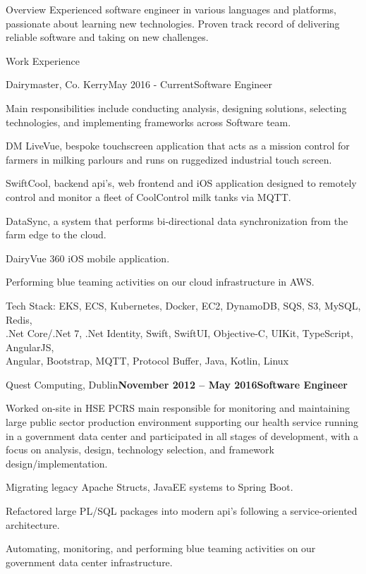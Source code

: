 \documentclass{résumé}
\begin{document}
\begin{rSection}{Overview}
\normalfont Experienced software engineer in various languages and platforms, passionate about learning new technologies. Proven track record of delivering reliable software and taking on new challenges. \\
\end{rSection}

\begin{rSection}{Work Experience}
\begin{rSubsection}{Dairymaster, Co. Kerry}{May 2016 - Current}{Software Engineer}{}
 \item \normalfont Main responsibilities include conducting analysis, designing solutions, selecting technologies, and implementing frameworks across Software team.
 \item \normalfont DM LiveVue, bespoke touchscreen application that acts as a mission control for farmers in milking parlours and runs on ruggedized industrial touch screen.
 \item \normalfont SwiftCool, backend api's, web frontend and iOS application designed to remotely control and monitor a fleet of CoolControl milk tanks via MQTT.
 \item \normalfont DataSync, a system that performs bi-directional data synchronization from the farm edge to the cloud.
 \item \normalfont DairyVue 360 iOS mobile application.
 \item \normalfont Performing blue teaming activities on our cloud infrastructure in AWS.
\end{rSubsection}

Tech Stack: \normalfont EKS, ECS, Kubernetes, Docker, EC2, DynamoDB, SQS, S3, MySQL, Redis, \\ .Net Core/.Net 7, .Net Identity, Swift, SwiftUI, Objective-C, UIKit, TypeScript, AngularJS, \\Angular, Bootstrap, MQTT, Protocol Buffer, Java, Kotlin, Linux \\

\begin{rSubsection}{Quest Computing, Dublin}{\textbf{November 2012 – May 2016}}{\textbf{Software Engineer}}{}
 \item \normalfont Worked on-site in HSE PCRS main responsible for monitoring and maintaining large public sector production environment supporting our health service running in a government data center and participated in all stages of development, with a focus on analysis, design, technology selection, and framework design/implementation.
 \item \normalfont Migrating legacy Apache Structs, JavaEE systems to Spring Boot.
 \item \normalfont Refactored large PL/SQL packages into modern api's following a service-oriented architecture.
 \item \normalfont Automating, monitoring, and performing blue teaming activities on our government data center infrastructure.
\end{rSubsection}


\end{rSection}
\end{document}
